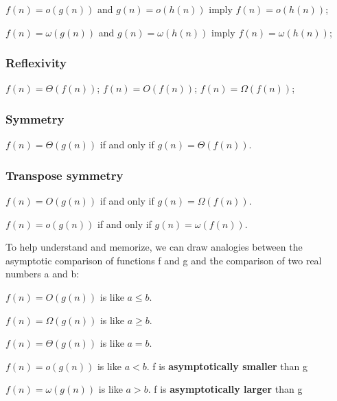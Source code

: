 \documentclass{article}
\begin{document}
\hspace{3cm} $f(n) = o(g(n))$ and $g(n) =o(h(n))$  \hspace{3mm} imply $f(n) = o(h(n))$;

\hspace{3cm} $f(n) = \omega(g(n))$ and $g(n) =\omega(h(n))$ \hspace{1.8mm} imply $f(n) = \omega(h(n))$;


\subsubsection*{Reflexivity}
\hspace{2cm} $f(n) = \Theta(f(n))$;
\hspace{2cm} $f(n) = O(f(n))$;
\hspace{2cm} $f(n) = \Omega(f(n))$;



\subsubsection*{Symmetry}
\hspace{3cm} $f(n) = \Theta(g(n))$ if and only if  $g(n) = \Theta(f(n))$.


\subsubsection*{Transpose symmetry}
\hspace{3cm} $f(n) = O(g(n))$ if and only if $g(n) = \Omega(f(n))$.

\hspace{3cm} $f(n) = o(g(n))$ if and only if $g(n) = \omega(f(n))$.

To help understand and memorize, we can draw analogies between the asymptotic comparison of functions f and g and the comparison of two real numbers a and b:

\hspace{5.5cm} $f(n) = O(g(n))$ is like $a\leq b$.

\hspace{5.5cm} $f(n) = \Omega(g(n))$ is like $a\geq b$.

\hspace{5.5cm} $f(n) = \Theta(g(n))$ is like $a = b$.

\hspace{3cm} $f(n) = o(g(n))$ is like $a < b$. f is \textbf{asymptotically smaller} than g

\hspace{3cm} $f(n) = \omega(g(n))$ is like $a > b$. f is \textbf{asymptotically larger} than g
\end{document}
